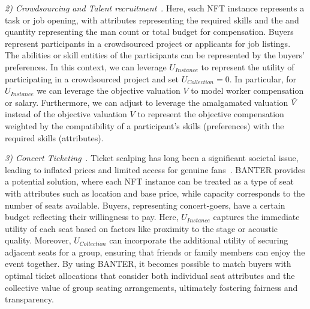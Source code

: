 \documentclass[conference]{IEEEtran}
\theoremstyle{plain}
\begin{document}
{    \textit{2) Crowdsourcing and Talent recruitment}~\cite{wang2021efficient, chai2018incentive, zhao2020predictive, yao2022knowledge}. Here, each NFT instance represents a task or job opening, with attributes representing the required skills and the and quantity representing the man count or total budget for compensation. Buyers represent participants in a crowdsourced project or applicants for job listings. The abilities or skill entities of the participants can be represented by the buyers' preferences. In this context, we can leverage $U_\textit{Instance}$ to represent the utility of participating in a crowdsourced project and set $U_\textit{Collection}=0$. In particular, for $U_\textit{Instance}$ we can leverage the objective valuation $V$ to model worker compensation or salary. Furthermore, we can adjust  to leverage the amalgamated valuation $\Tilde{V}$ instead of the objective valuation $V$ to represent the objective compensation weighted by the compatibility of a participant’s skills (preferences) with the required skills (attributes).
    

    \textit{3) Concert Ticketing}~\cite{sastiono2016studies, stein2014will}. Ticket scalping has long been a significant societal issue, leading to inflated prices and limited access for genuine fans~\cite{stein2014will}. BANTER\xspace provides a potential solution, where each NFT instance can be treated as a type of seat with attributes such as location and base price, while capacity corresponds to the number of seats available. Buyers, representing concert-goers, have a certain budget reflecting their willingness to pay. Here, $U_{\textit{Instance}}$ captures the immediate utility of each seat based on factors like proximity to the stage or acoustic quality. Moreover, $U_{\textit{Collection}}$ can incorporate the additional utility of securing adjacent seats for a group, ensuring that friends or family members can enjoy the event together. By using BANTER\xspace, it becomes possible to match buyers with optimal ticket allocations that consider both individual seat attributes and the collective value of group seating arrangements, ultimately fostering fairness and transparency.
    
    
    
}
\end{document}
